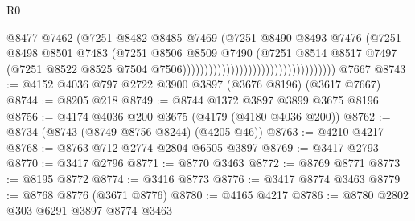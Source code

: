 \begin{lexlean}{R0}
\begin{coremodule}
                                                              @8477
                                                              @7462
                                                              (@7251
                                                                @8482
                                                                @8485
                                                                @7469
                                                                (@7251
                                                                  @8490
                                                                  @8493
                                                                  @7476
                                                                  (@7251
                                                                    @8498
                                                                    @8501
                                                                    @7483
                                                                    (@7251
                                                                      @8506
                                                                      @8509
                                                                      @7490
                                                                      (@7251
                                                                        @8514
                                                                        @8517
                                                                        @7497
                                                                        (@7251
                                                                          @8522
                                                                          @8525
                                                                          @7504
                                                                          @7506)))))))))))))))))))))))))))))))))))
    @7667
@8743 := @4152 @4036 @797 @2722 @3900 @3897 (@3676 @8196) (@3617 @7667)
@8744 := @8205 @218
@8749 := @8744 @1372 @3897 @3899 @3675 @8196
@8756 := @4174 @4036 @200 @3675 (@4179 (@4180 @4036 @200))
@8762 := @8734 (@8743 (@8749 @8756 @8244) (@4205 @46))
@8763 := @4210 @4217
@8768 := @8763 @712 @2774 @2804 @6505 @3897
@8769 := @3417 @2793
@8770 := @3417 @2796
@8771 := @8770 @3463
@8772 := @8769 @8771
@8773 := @8195 @8772
@8774 := @3416 @8773
@8776 := @3417 @8774 @3463
@8779 := @8768 @8776 (@3671 @8776)
@8780 := @4165 @4217
@8786 := @8780 @2802 @303 @6291 @3897 @8774 @3463

\end{coremodule}
\end{lexlean}
